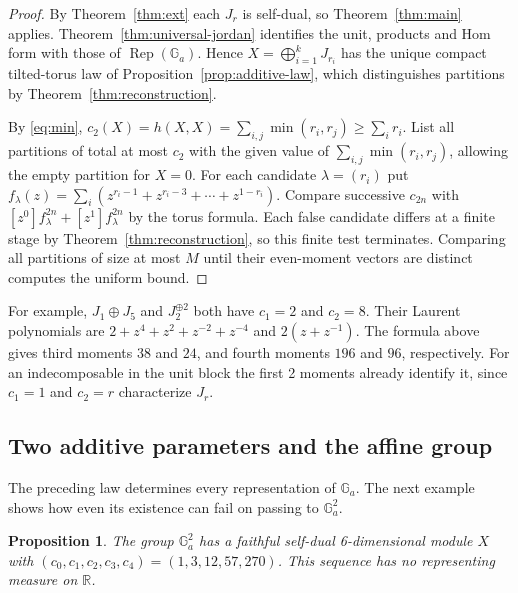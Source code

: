 \documentclass[11pt,reqno]{amsart}
\newtheorem{proposition}[theorem]{Proposition}
\theoremstyle{definition}
\newcommand{\RR}{\mathbb R}
\newcommand{\Ga}{\mathbb G_a}
\newcommand{\Rep}{\operatorname{Rep}}
\begin{document}
\begin{proof}
By Theorem~\ref{thm:ext} each $J_r$ is self-dual, so Theorem~\ref{thm:main} applies. Theorem~\ref{thm:universal-jordan} identifies the unit, products and Hom form with those of $\Rep(\Ga)$. Hence $X=\bigoplus_{i=1}^kJ_{r_i}$ has the unique compact tilted-torus law of Proposition~\ref{prop:additive-law}, which distinguishes partitions by Theorem~\ref{thm:reconstruction}.

By \eqref{eq:min}, $c_2(X)=h(X,X)=\sum_{i,j}\min(r_i,r_j)\ge\sum_i r_i$. List all partitions of total at most $c_2$ with the given value of $\sum_{i,j}\min(r_i,r_j)$, allowing the empty partition for $X=0$. For each candidate $\lambda=(r_i)$ put $f_\lambda(z)=\sum_i(z^{r_i-1}+z^{r_i-3}+\cdots+z^{1-r_i})$. Compare successive $c_{2n}$ with $[z^0]f_\lambda^{2n}+[z^1]f_\lambda^{2n}$ by the torus formula. Each false candidate differs at a finite stage by Theorem~\ref{thm:reconstruction}, so this finite test terminates. Comparing all partitions of size at most $M$ until their even-moment vectors are distinct computes the uniform bound.
\end{proof}

For example, $J_1\oplus J_5$ and $J_2^{\oplus2}$ both have $c_1=2$ and $c_2=8$. Their Laurent polynomials are $2+z^4+z^2+z^{-2}+z^{-4}$ and $2(z+z^{-1})$. The formula above gives third moments $38$ and $24$, and fourth moments $196$ and $96$, respectively. For an indecomposable in the unit block the first 2 moments already identify it, since $c_1=1$ and $c_2=r$ characterize $J_r$.

\subsection{Two additive parameters and the affine group}
The preceding law determines every representation of $\Ga$. The next
example shows how even its existence can fail on passing to $\Ga^2$.

\begin{proposition}\label{prop:plane}
The group $\Ga^2$ has a faithful self-dual 6-dimensional module $X$ with $(c_0,c_1,c_2,c_3,c_4)=(1,3,12,57,270)$. This sequence has no representing measure on $\RR$.
\end{proposition}
\end{document}
